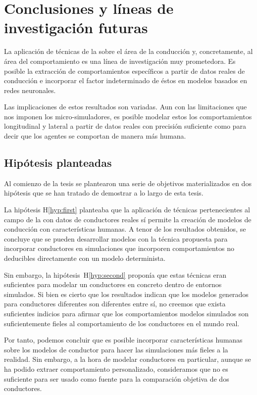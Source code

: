 \chapter{Conclusiones y líneas de investigación futuras}
\label{ch:conclusions}

La aplicación de técnicas de la  sobre el área de la conducción y, concretamente, al área del comportamiento es una línea de investigación muy prometedora. Es posible la extracción de comportamientos específicos a partir de datos reales de conducción e incorporar el factor indeterminado de éstos en modelos basados en redes neuronales.

Las implicaciones de estos resultados son variadas. Aun con las limitaciones que nos imponen los micro-simuladores, es posible modelar estos los comportamientos longitudinal y lateral a partir de datos reales con precisión suficiente como para decir que los agentes se comportan de manera más humana.

\section{Hipótesis planteadas}

Al comienzo de la tesis se plantearon una serie de objetivos materializados en dos hipótesis que se han tratado de demostrar a lo largo de esta tesis.

La hipótesis H\ref{hyp:first} planteaba que la aplicación de técnicas pertenecientes al campo de la  con datos de conductores reales sí permite la creación de modelos de conducción con características humanas. A tenor de los resultados obtenidos, se concluye que se pueden desarrollar modelos con la técnica propuesta para incorporar conductores en simulaciones que incorporen comportamientos no deducibles directamente con un modelo determinista.

Sin embargo, la hipótesis~H\ref{hyp:second} proponía que estas técnicas eran suficientes para modelar un conductores en concreto dentro de entornos simulados. Si bien es cierto que los resultados indican que los modelos generados para conductores diferentes son diferentes entre sí, no creemos que exista suficientes indicios para afirmar que los comportamientos modelos simulados son suficientemente fieles al comportamiento de los conductores en el mundo real.

Por tanto, podemos concluir que es posible incorporar características humanas sobre los modelos de conductor para hacer las simulaciones más fieles a la realidad. Sin embargo, a la hora de modelar conductores en particular, aunque se ha podido extraer comportamiento personalizado, consideramos que no es suficiente para ser usado como fuente para la comparación objetiva de dos conductores.


